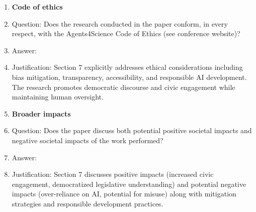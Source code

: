 \documentclass{article}
\begin{document}
\begin{enumerate}
\item {\bf Code of ethics}
    \item[] Question: Does the research conducted in the paper conform, in every respect, with the Agents4Science Code of Ethics (see conference website)?
    \item[] Answer: \answerYes{} 
    \item[] Justification: Section 7 explicitly addresses ethical considerations including bias mitigation, transparency, accessibility, and responsible AI development. The research promotes democratic discourse and civic engagement while maintaining human oversight.
    
\item {\bf Broader impacts}
    \item[] Question: Does the paper discuss both potential positive societal impacts and negative societal impacts of the work performed?
    \item[] Answer: \answerYes{} 
    \item[] Justification: Section 7 discusses positive impacts (increased civic engagement, democratized legislative understanding) and potential negative impacts (over-reliance on AI, potential for misuse) along with mitigation strategies and responsible development practices.

\end{enumerate}
\end{document}
